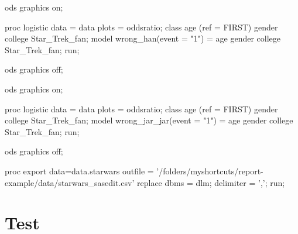 \documentclass{article}\usepackage[]{graphicx}\usepackage[]{color}
\begin{document}
\begin{Sascode}[store = logistic]
ods graphics on;

proc logistic data = data plots = oddsratio;
 class age (ref = FIRST) gender college Star_Trek_fan;
 model wrong_han(event = "1") = age gender college Star_Trek_fan;
run;

ods graphics off;
\end{Sascode}

\begin{Sascode}[store = logisticj]
ods graphics on;

proc logistic data = data plots = oddsratio;
 class age (ref = FIRST) gender college Star_Trek_fan;
 model wrong_jar_jar(event = "1") = age gender college Star_Trek_fan;
run;

ods graphics off;
\end{Sascode}






\begin{Sascode}
proc export data=data.starwars
   outfile =
     '/folders/myshortcuts/report-example/data/starwars_sasedit.csv'
   replace
   dbms = dlm;
   delimiter = ',';
run;
\end{Sascode}

\section{Test}
\end{document}

